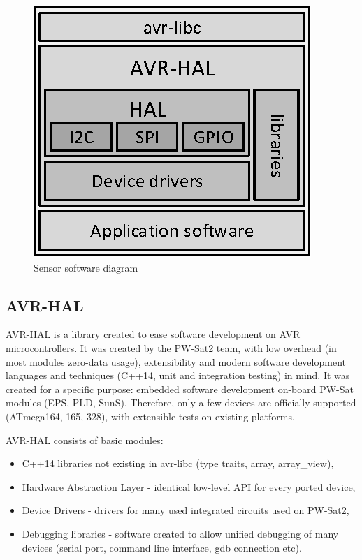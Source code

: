     \begin{figure}[H]
        \centering
        \includegraphics[width=0.5\paperwidth]{img/06/software_diagram.eps}
        \caption{Sensor software diagram}
        \label{Sensor_software_diagram}
    \end{figure}

    \subsection{AVR-HAL}
    AVR-HAL is a library created to ease software development on AVR microcontrollers. It was created by the PW-Sat2 team, with low overhead (in most modules zero-data usage), extensibility and modern software development languages and techniques (C++14, unit and integration testing) in mind. It was created for a specific purpose: embedded software development on-board PW-Sat modules (EPS, PLD, SunS). Therefore, only a few devices are officially supported (ATmega164, 165, 328), with extensible tests on existing platforms.

    AVR-HAL consists of basic modules:
    \begin{itemize}
        \item C++14 libraries not existing in avr-libc (type traits, array, array\_view),
        \item Hardware Abstraction Layer - identical low-level API for every ported device,
        \item Device Drivers - drivers for many used integrated circuits used on PW-Sat2,
        \item Debugging libraries - software created to allow unified debugging of many devices (serial port, command line interface, gdb connection etc).
    \end{itemize}

